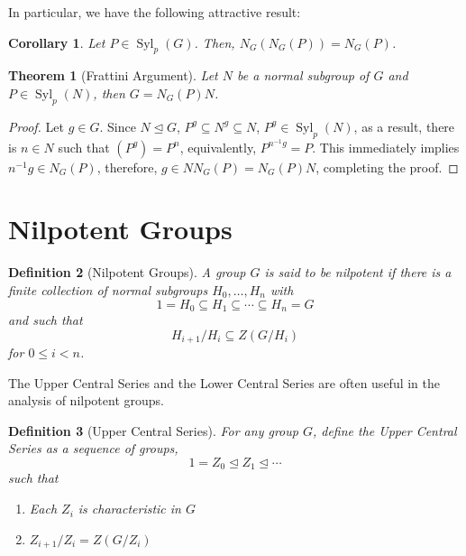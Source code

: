 \documentclass[12pt]{article}
\theoremstyle{thmstyle}
\newtheorem{theorem}{Theorem}[section]
\theoremstyle{defstyle}
\newtheorem{definition}[theorem]{Definition}
\newtheorem*{corollary}{Corollary}
\renewcommand{\le}{\leqslant}
\newcommand{\Syl}{\operatorname{Syl}}
\begin{document}
In particular, we have the following attractive result:
\begin{corollary}
    Let $P\in\Syl_p(G)$. Then, $N_G(N_G(P)) = N_G(P)$.
\end{corollary}

\begin{theorem}[Frattini Argument]
    Let $N$ be a normal subgroup of $G$ and $P\in\Syl_p(N)$, then $G = N_G(P)N$.
\end{theorem}
\begin{proof}
    Let $g\in G$. Since $N\unlhd G$, $P^g\subseteq N^g\subseteq N$, $P^g\in\Syl_p(N)$, as a result, there is $n\in N$ such that $(P^g) = P^n$, equivalently, $P^{n^{-1}g} = P$. This immediately implies $n^{-1}g\in N_G(P)$, therefore, $g\in NN_G(P) = N_G(P)N$, completing the proof.
\end{proof}

\section{Nilpotent Groups}

\begin{definition}[Nilpotent Groups]
    A group $G$ is said to be \textit{nilpotent} if there is a finite collection of normal subgroups $H_0,\ldots,H_n$ with 
    \begin{equation*}
        1 = H_0\subseteq H_1\subseteq\cdots\subseteq H_n = G
    \end{equation*}
    and such that 
    \begin{equation*}
        H_{i + 1}/H_i\subseteq Z(G/H_{i})
    \end{equation*}
    for $0\le i < n$.
\end{definition}

The Upper Central Series and the Lower Central Series are often useful in the analysis of nilpotent groups.

\begin{definition}[Upper Central Series]
    For any group $G$, define the \textit{Upper Central Series} as a sequence of groups,
    \begin{equation*}
        1 = Z_0\unlhd Z_1\unlhd\cdots
    \end{equation*}
    such that 
    \begin{enumerate}
        \item Each $Z_i$ is characteristic in $G$ 
        \item $Z_{i + 1}/Z_i = Z(G/Z_i)$
    \end{enumerate}
\end{definition}
\end{document}

